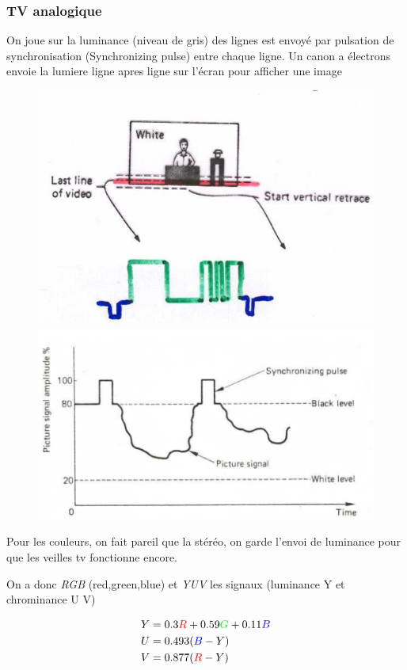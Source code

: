 \documentclass[12pt]{article}
\begin{document}
		\subsubsection{TV analogique}
		
			On joue sur la luminance (niveau de gris) des lignes est envoyé par pulsation de synchronisation (Synchronizing pulse) entre chaque ligne.
			Un canon a électrons envoie la lumiere ligne apres ligne sur l'écran pour afficher une image
			
\begin{figure}
\centering
\begin{minipage}{.5\textwidth}
  \centering
  \includegraphics[width=.5\textwidth]{img/TV1.png}
\end{minipage}%
\begin{minipage}{.5\textwidth}
  \centering
  \includegraphics[width=.5\textwidth]{img/TV2.png}
\end{minipage}
\end{figure}
			
			Pour les couleurs, on fait pareil que la stéréo, on garde l'envoi de luminance pour que les veilles tv fonctionne encore.
			
			On a donc \textit{RGB} (red,green,blue) et \textit{YUV} les signaux (luminance Y et chrominance U V)
			
			\begin{align*} 
				Y &= 0.3\textcolor{red}{R} + 0.59\textcolor{green}{G} + 0.11\textcolor{blue}{B}\\
				U &= 0.493(\textcolor{blue}{B}-Y)\\
				V &= 0.877(\textcolor{red}{R}-Y)
			\end{align*}
\end{document}
